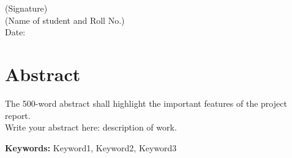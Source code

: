 \documentclass[12pt,a4paper,twoside,openright]{report}
\begin{document}
	\vspace{1cm}
	\begin{flushright}
		(Signature) \\[0.5cm]
		(Name of student and Roll No.) \\
		Date:
	\end{flushright}
	
	
	\chapter*{Abstract}
	The 500-word abstract shall highlight the important features of the project report. \\
	Write your abstract here: description of work.
	
	\textbf{Keywords:} Keyword1, Keyword2, Keyword3
	
	\newpage
	\tableofcontents
	
	\newpage
	\listoffigures
	
	\newpage
	\listoftables
	
	
	
	
	
	
	

	
	
	
	
	

	
	
	
	
	
	
	\printbibliography
	
	
	

	
	
\end{document}
